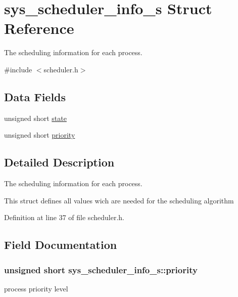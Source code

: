 \hypertarget{structsys__scheduler__info__s}{}\section{sys\+\_\+scheduler\+\_\+info\+\_\+s Struct Reference}
\label{structsys__scheduler__info__s}


The scheduling information for each process.  




{\ttfamily \#include $<$scheduler.\+h$>$}

\subsection*{Data Fields}
\begin{DoxyCompactItemize}
\item 
unsigned short \hyperlink{structsys__scheduler__info__s_a95d0294a71162ffbd1e65fd381e54a6b}{state}
\item 
unsigned short \hyperlink{structsys__scheduler__info__s_ad04085351f98898a0631e07aba0338d6}{priority}
\end{DoxyCompactItemize}


\subsection{Detailed Description}
The scheduling information for each process. 

This struct defines all values wich are needed for the scheduling algorithm 

Definition at line 37 of file scheduler.\+h.



\subsection{Field Documentation}
\hypertarget{structsys__scheduler__info__s_ad04085351f98898a0631e07aba0338d6}{}
\subsubsection[{priority}]{\setlength{\rightskip}{0pt plus 5cm}unsigned short sys\+\_\+scheduler\+\_\+info\+\_\+s\+::priority}\label{structsys__scheduler__info__s_ad04085351f98898a0631e07aba0338d6}
process priority level 

